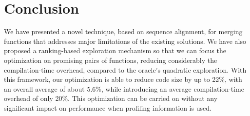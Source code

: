 \vspace{-3ex}
\section{Conclusion}

We have presented a novel technique, based on sequence alignment, for merging
functions that addresses major limitations of the existing solutions.
We have also proposed a ranking-based exploration mechanism so that we can focus
the optimization on promising pairs of functions, reducing considerably the
compilation-time overhead, compared to the oracle's quadratic exploration.
With this framework, our 
optimization is able to reduce code size by up to 22\%, with an overall average
of about 5.6\%, while introducing an average compilation-time overhead of only 20\%.
This optimization can be carried on without any significant impact on
performance when profiling information is used.




